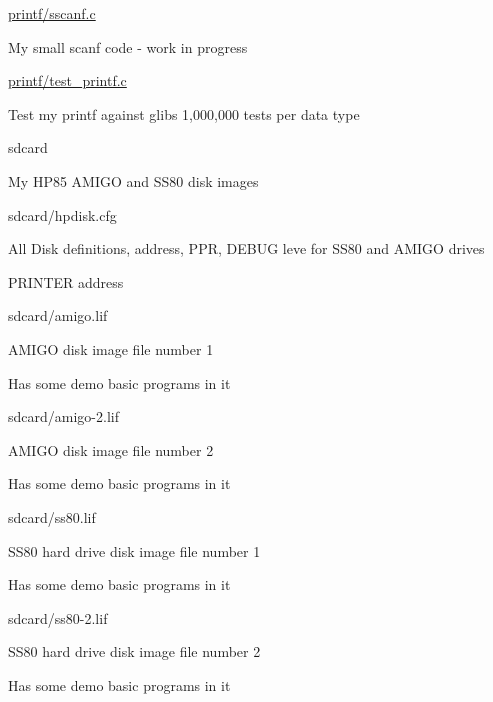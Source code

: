 \begin{DoxyPre}
\begin{DoxyItemize}
\begin{DoxyItemize}
\begin{DoxyItemize}
\end{DoxyItemize}
\item \hyperlink{sscanf_8c}{printf/sscanf.c}
\begin{DoxyItemize}
\item My small scanf code - work in progress
\end{DoxyItemize}
\item \hyperlink{test__printf_8c}{printf/test\_printf.c}
\begin{DoxyItemize}
\item Test my printf against glibs 1,000,000 tests per data type
\end{DoxyItemize}
\end{DoxyItemize}
\item sdcard
\begin{DoxyItemize}
\item My HP85 AMIGO and SS80 disk images
\begin{DoxyItemize}
\item sdcard/hpdisk.cfg
\begin{DoxyItemize}
\item All Disk definitions, address, PPR, DEBUG leve for SS80 and AMIGO drives
\item PRINTER address
\end{DoxyItemize}
\item sdcard/amigo.lif
\begin{DoxyItemize}
\item AMIGO disk image file number 1
\item Has some demo basic programs in it
\end{DoxyItemize}
\item sdcard/amigo-2.lif
\begin{DoxyItemize}
\item AMIGO disk image file number 2
\item Has some demo basic programs in it
\end{DoxyItemize}
\item sdcard/ss80.lif
\begin{DoxyItemize}
\item SS80 hard drive disk image file number 1
\item Has some demo basic programs in it
\end{DoxyItemize}
\item sdcard/ss80-2.lif
\begin{DoxyItemize}
\item SS80 hard drive disk image file number 2
\item Has some demo basic programs in it

\end{DoxyItemize}
\end{DoxyItemize}
\end{DoxyItemize}
\end{DoxyItemize}
\end{DoxyPre}
